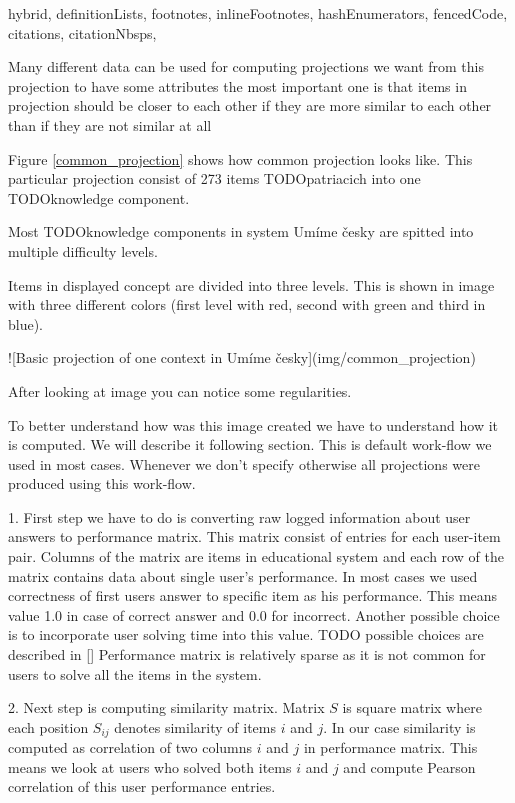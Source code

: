 \documentclass[
  digital, %
  table,   %
  nolof,     %
  nolot,     %
  nocover
]{fithesis3}
\begin{document}
\begin{markdown*}{%
  hybrid,
  definitionLists,
  footnotes,
  inlineFootnotes,
  hashEnumerators,
  fencedCode,
  citations,
  citationNbsps,
}

Many different data can be used for computing projections
we want from this projection to have some attributes
the most important one is that items in projection should be closer to each other if they are more similar to each other than if they are not similar at all


Figure \ref{common_projection} shows how common projection looks like. This particular projection consist of 273 items TODOpatriacich into one TODOknowledge component.

Most TODOknowledge components in system Umíme česky are spitted into multiple difficulty levels.

Items in displayed concept are divided into three levels. This is shown in image with three different colors (first level with red, second with green and third in blue).

![Basic projection of one context in Umíme česky\label{common_projection}](img/common_projection)


After looking at image you can notice some regularities.



To better understand how was this image created we have to understand how it is computed. We will describe it following section. This is default work-flow we used in most cases. Whenever we don't specify otherwise all projections were produced using this work-flow.


1. First step we have to do is converting raw logged information about user answers to performance matrix. This matrix consist of entries for each user-item pair. Columns of the matrix are items in educational system and each row of the matrix contains data about single user's performance. In most cases we used correctness of first users answer to specific item as his performance. This means value 1.0 in case of correct answer and 0.0 for incorrect. Another possible choice is to incorporate user solving time into this value. TODO possible choices are described in [] Performance matrix is relatively sparse as it is not common for users to solve all the items in the system.


2. Next step is computing similarity matrix. Matrix $S$ is square matrix where each position $S_{ij}$ denotes similarity of items $i$ and $j$. In our case similarity is computed as correlation of two columns $i$ and $j$ in performance matrix. This means we look at users who solved both items $i$ and $j$ and compute Pearson correlation of this user performance entries.


\end{markdown*}
\end{document}
